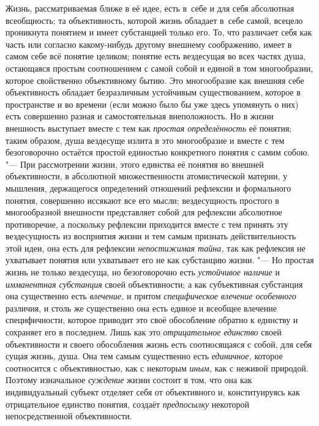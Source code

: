 Жизнь, рассматриваемая ближе в её идее, есть в~себе и для себя
абсолютная всеобщность; та объективность, которой жизнь обладает в~себе
самой, всецело проникнута понятием и имеет субстанцией только его. То, что
различает себя как часть или согласно какому-нибудь другому внешнему
соображению, имеет в самом себе всё понятие целиком; понятие есть
вездесущая во всех частях душа, остающаяся простым соотношением с самой
собой и единой в том многообразии, которое свойственно объективному бытию.
Это многообразие как внешняя себе объективность обладает безразличным
устойчивым существованием, которое в пространстве и во времени (если можно
было бы уже здесь упомянуть о них) есть совершенно разная и самостоятельная
внеположность. Но в жизни внешность выступает вместе с тем как
{\em простая определённость}
её понятия; таким образом, душа вездесуще излита в это
многообразие и вместе с тем безоговорочно остаётся простой единостью
конкретного понятия с самим собою. "--- При рассмотрении жизни,
этого единства её понятия во внешней объективности, в абсолютной
множественности атомистической материи, у мышления,
держащегося определений отношений рефлексии и формального понятия,
совершенно иссякают все его мысли; вездесущность простого в многообразной
внешности представляет собой для рефлексии абсолютное противоречие, а
поскольку рефлексии приходится вместе с тем принять эту вездесущность из
восприятия жизни и тем самым признать действительность этой идеи, она есть
для рефлексии {\em непостижимая тайна,}
так как рефлексия не ухватывает понятия или ухватывает его не
как субстанцию жизни. "--- Но простая жизнь не только
вездесуща, но безоговорочно есть
{\em устойчивое наличие}
и {\em имманентная
субстанция} своей объективности; а как субъективная
субстанция она существенно есть
{\em влечение,} и притом
{\em специфическое влечение особенного}
различия, и столь же существенно она есть единое и всеобщее
влечение специфичности, которое приводит это своё обособление обратно к
единству и сохраняет его в последнем. Лишь как это
{\em отрицательное единство}
своей объективности и своего обособления жизнь есть
соотносящаяся с собой, для себя сущая жизнь, душа. Она тем самым
существенно есть {\em единичное,}
которое соотносится с объективностью, как с некоторым {\em иным,}
как с неживой природой. Поэтому изначальное
{\em суждение}
жизни состоит в том, что она как индивидуальный субъект
отделяет себя от объективного и, конституируясь как отрицательное единство
понятия, создаёт {\em предпосылку} некоторой непосредственной объективности.

